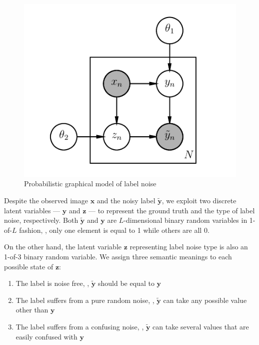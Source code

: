 \documentclass[10pt,twocolumn,letterpaper]{article}
\def\vec{\mathbf}
\begin{document}
\begin{figure}[h!]
\begin{center}
\includegraphics[width=0.5\linewidth]{figure/pgm.pdf}
\end{center}
\caption{Probabilistic graphical model of label noise}
\label{fig:noise_pgm}
\end{figure}

Despite the observed image $\vec{x}$ and the noisy label $\tilde{\vec{y}}$, we exploit two discrete latent variables --- $\vec{y}$ and $\vec{z}$ --- to represent the ground truth and the type of label noise, respectively. Both $\tilde{\vec{y}}$ and $\vec{y}$ are $L$-dimensional binary random variables in 1-of-$L$ fashion, \ie, only one element is equal to 1 while others are all 0.

On the other hand, the latent variable $\vec{z}$ representing label noise type is also an 1-of-3 binary random variable. We assign three semantic meanings to each possible state of $\vec{z}$:
\begin{enumerate}
    \item The label is noise free, \ie, $\tilde{\vec{y}}$ should be equal to $\vec{y}$
    \item The label suffers from a pure random noise, \ie, $\tilde{\vec{y}}$ can take any possible value other than $\vec{y}$
    \item The label suffers from a confusing noise, \ie, $\tilde{\vec{y}}$ can take several values that are easily confused with $\vec{y}$
\end{enumerate}
\end{document}
